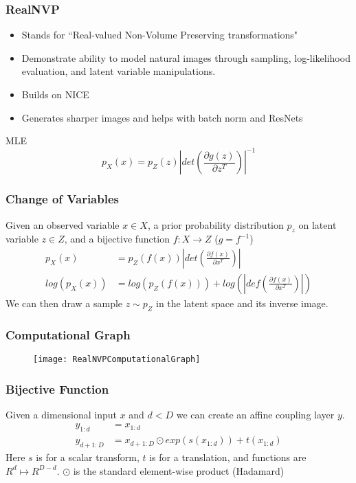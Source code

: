 \begin{frame}
\frametitle{RealNVP}
    \begin{itemize}
        \item Stands for ``Real-valued Non-Volume Preserving transformations"
        \item Demonstrate ability to model natural images through sampling,
        log-likelihood evaluation, and latent variable manipulations.
        \item Builds on NICE
        \item Generates sharper images and helps with batch norm and ResNets
    \end{itemize}
    MLE
    \begin{equation*}
        p_X(x) = p_Z(z) \left| det\left(\frac{\partial g(z)}{\partial
                z^T}\right)\right|^{-1}
    \end{equation*}
\end{frame}

\begin{frame}
\frametitle{Change of Variables}
Given an observed variable $x\in X$, a prior probability distribution $p_z$
on latent variable $z\in Z$, and a bijective function $f:X\rightarrow Z$
($g=f^{-1}$)
    \begin{align*}
        p_X(x) &= p_Z(f(x))\left | det \left(\frac{\partial f(x)}{\partial
                x^T}\right)\right|\\
        log(p_X(x)) &= log(p_Z(f(x))) + log\left(\left|def\left( \frac{\partial
                    f(x)}{\partial x^T}\right)\right|\right)
    \end{align*}
We can then draw a sample $z\sim p_Z$ in the latent space and its inverse image.
\end{frame}

\begin{frame}
\frametitle{Computational Graph}
\begin{figure}
    \centering
    \texttt{[image: RealNVPComputationalGraph]}
\end{figure}
\end{frame}

\begin{frame}
\frametitle{Bijective Function}
Given a dimensional input $x$ and $d<D$ we can create an affine coupling layer
$y$.
    \begin{align*}
        y_{1:d} &= x_{1:d}\\
        y_{d+1:D} &= x_{d+1:D} \odot exp(s(x_{1:d})) + t(x_{1:d})
    \end{align*}
Here $s$ is for a scalar transform, $t$ is for a translation, and functions are
$R^d \mapsto R^{D-d}$. $\odot$ is the standard element-wise product (Hadamard)

\end{frame}

